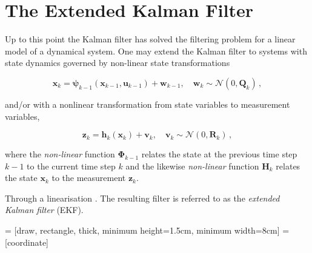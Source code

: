 \section{The Extended Kalman Filter}

Up to this point the Kalman filter has solved the filtering problem for a linear model of a dynamical system. One may extend the Kalman filter to systems with state dynamics governed by non-linear state transformations

\begin{equation}\label{eq:time_dynamical_system_plant_extended}
  \mathbf{x}_k = \mathbf{\psi}_{k-1}(\mathbf{x}_{k-1}, \mathbf{u}_{k-1})+\mathbf{w}_{k-1}, \quad \mathbf{w}_{k} \sim \mathcal{N}(0,\mathbf{Q}_k)\,,
\end{equation}

\noindent
and/or with a nonlinear transformation from state variables to measurement variables,

\begin{equation}\label{eq:time_dynamical_system_measurement_extended}
  \mathbf{z}_k = \mathbf{h}_{k}(\mathbf{x}_{k})+\mathbf{v}_{k}, \quad \mathbf{v}_{k} \sim \mathcal{N}(0,\mathbf{R}_k)\,,
\end{equation}

\noindent
where the \emph{non-linear} function $\mathbf{\Phi}_{k-1}$ relates the state at the previous time step $k-1$ to the current time step $k$ and the likewise \emph{non-linear} function $\mathbf{H}_{k}$ relates the state $\mathbf{x}_{k}$ to the measurement $\mathbf{z}_k$.



Through a linearisation . The resulting filter is referred to as the \emph{extended Kalman filter} (EKF).

 = [draw, rectangle, thick, 
    minimum height=1.5cm, minimum width=8cm]
 = [coordinate]

